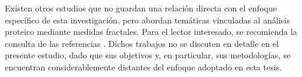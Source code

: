 Existen otros estudios que no guardan una relación directa con el enfoque específico de esta investigación, pero abordan temáticas vinculadas al análisis proteico mediante medidas fractales. Para el lector interesado, se recomienda la consulta de las referencias \cite{Shen2001, Banerji2013, Sendker2024}. Dichos trabajos no se discuten en detalle en el presente estudio, dado que sus objetivos y, en particular, sus metodologías, se encuentran considerablemente distantes del enfoque adoptado en esta tesis.

\color{black}